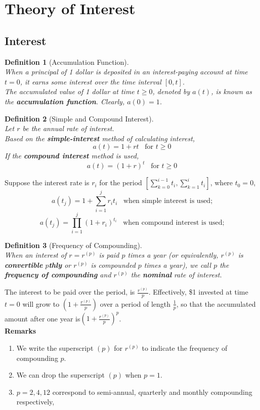 \documentclass[12pt]{article}
\newtheorem{definition}{Definition}[section]
\theoremstyle{definition}
\begin{document}
\section{Theory of Interest}
\subsection{Interest}
\begin{definition}[Accumulation Function]
\hfill\\\normalfont When a principal of 1 dollar is deposited in an interest-paying account at time $t=0$, it earns some interest over the time interval $[0,t]$. \\
The accumulated value of 1 dollar at time $t \geq 0$, denoted by $a(t)$, is known as the \textbf{accumulation function}. Clearly, $a(0)=1$.
\end{definition}
\begin{definition}[Simple and Compound Interest]
\hfill\\\normalfont Let $r$ be the annual rate of interest.\\
Based on the \textbf{simple-interest} method of calculating interest,
\[
a(t)=1+rt\;\;\;\text{for }t \geq 0
\]
If the \textbf{compound interest} method is used,
\[
a(t)=(1+r)^t \;\;\;\text{for }t\geq 0
\]
\end{definition}
Suppose the interest rate is $r_i$ for the period $[\sum_{k=0}^{i-1} t_i,\sum_{k=1}^{i} t_{i} ]$, where $t_0 = 0$, 
\[
a(t_j)=1+\sum_{i=1}^j r_it_i \;\;\;\text{when simple interest is used;}
\]
\[
a(t_j)=\prod_{i=1}^j (1+r_i)^{t_i}\;\;\;\text{when compound interest is used;}
\]
\begin{definition}[Frequency of Compounding]
\hfill\\\normalfont When an interest of $r = r^{(p)}$ is paid $p$ times a year (or equivalently, $r^{(p)}$ is \textbf{convertible} $p$\textbf{thly} or $r^{(p)}$ is compounded $p$ times a year), we call $p$ the \textbf{frequency of compounding} and $r^{(p)}$ the \textbf{nominal} rate of interest.
\end{definition}
The interest to be paid over the period, is $\frac{r^{(p)}}{p}$. Effectively, \$1 invested at time $t=0$ will grow to $\left(1+\frac{r^{(p)}}{p}\right)$ over a period of length $\frac{1}{p}$, so that the accumulated amount after one year is$\left(1+\frac{r^{(p)}}{p}\right)^p$.\\
\textbf{Remarks}
\begin{enumerate}
  \item We write the superscript $(p)$ for $r^{(p)}$ to indicate the frequency of compounding $p$.
  \item We can drop the superscript $(p)$ when $p=1$.
  \item $p = 2, 4, 12 $ correspond to semi-annual, quarterly and monthly compounding respectively,
\end{enumerate}
\end{document}
